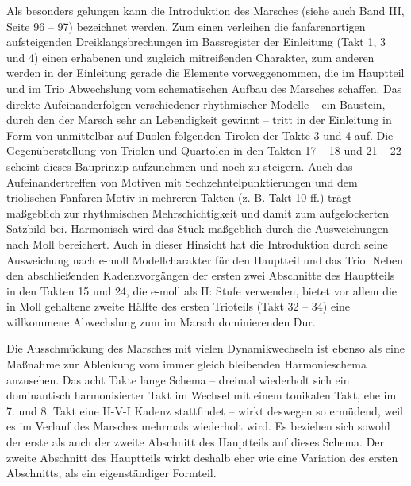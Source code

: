 Als besonders gelungen kann die Introduktion des Marsches (siehe auch
Band III, Seite 96 – 97) bezeichnet werden. Zum einen verleihen die
fanfarenartigen aufsteigenden Dreiklangsbrechungen im Bassregister der
Einleitung (Takt 1, 3 und 4) einen erhabenen und zugleich mitreißenden
Charakter, zum anderen werden in der Einleitung gerade die Elemente
vorweggenommen, die im Hauptteil und im Trio Abwechslung vom
schematischen Aufbau des Marsches schaffen. Das direkte
Aufeinanderfolgen verschiedener rhythmischer Modelle – ein Baustein,
durch den der Marsch sehr an Lebendigkeit gewinnt – tritt in der
Einleitung in Form von unmittelbar auf Duolen folgenden Tirolen der
Takte 3 und 4 auf. Die Gegenüberstellung von Triolen und Quartolen in
den Takten 17 – 18 und 21 – 22 scheint dieses Bauprinzip aufzunehmen
und noch zu steigern. Auch das Aufeinandertreffen von Motiven mit
Sechzehntelpunktierungen und dem triolischen Fanfaren-Motiv in mehreren
Takten (z. B. Takt 10 ff.) trägt maßgeblich zur rhythmischen
Mehrschichtigkeit und damit zum aufgelockerten Satzbild bei. Harmonisch
wird das Stück maßgeblich durch die Ausweichungen nach Moll bereichert.
Auch in dieser Hinsicht hat die Introduktion durch seine Ausweichung
nach e-moll Modellcharakter für den Hauptteil und das Trio. Neben den
abschließenden Kadenzvorgängen der ersten zwei Abschnitte des
Hauptteils in den Takten 15 und 24, die e-moll als II: Stufe verwenden,
bietet vor allem die in Moll gehaltene zweite Hälfte des ersten
Trioteils (Takt 32 – 34) eine willkommene Abwechslung zum im Marsch
dominierenden Dur.

Die Ausschmückung des Marsches mit vielen Dynamikwechseln ist ebenso als
eine Maßnahme zur Ablenkung vom immer gleich bleibenden Harmonieschema
anzusehen. Das acht Takte lange Schema – dreimal wiederholt sich ein
dominantisch harmonisierter Takt im Wechsel mit einem tonikalen Takt,
ehe im 7. und 8. Takt eine\newline
II-V-I Kadenz stattfindet – wirkt deswegen so ermüdend, weil es im
Verlauf des Marsches mehrmals wiederholt wird. Es beziehen sich sowohl
der erste als auch der zweite Abschnitt des Hauptteils auf dieses
Schema. Der zweite Abschnitt des Hauptteils wirkt deshalb eher wie eine
Variation des ersten Abschnitts, als ein eigenständiger Formteil.